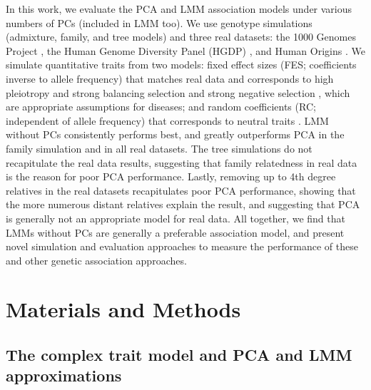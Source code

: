 \documentclass[11pt]{article}
\begin{document}
In this work, we evaluate the PCA and LMM association models under various numbers of PCs (included in LMM too).
We use genotype simulations (admixture, family, and tree models) and three real datasets: the 1000 Genomes Project \citep{the_1000_genomes_project_consortium_map_2010, 1000_genomes_project_consortium_integrated_2012}, the Human Genome Diversity Panel (HGDP) \citep{cann_human_2002, rosenberg_genetic_2002, bergstrom_insights_2020}, and Human Origins \citep{patterson_ancient_2012, lazaridis_ancient_2014, lazaridis_genomic_2016, skoglund_genomic_2016}.
We simulate quantitative traits from two models: fixed effect sizes (FES; coefficients inverse to allele frequency) that matches real data \citep{park_distribution_2011, zeng_signatures_2018, oconnor_extreme_2019} and corresponds to high pleiotropy and strong balancing selection \citep{simons_population_2018} and strong negative selection \citep{zeng_signatures_2018, oconnor_extreme_2019}, which are appropriate assumptions for diseases; and random coefficients (RC; independent of allele frequency) that corresponds to neutral traits \citep{zeng_signatures_2018, simons_population_2018}.
LMM without PCs consistently performs best, and greatly outperforms PCA in the family simulation and in all real datasets.
The tree simulations do not recapitulate the real data results, suggesting that family relatedness in real data is the reason for poor PCA performance.
Lastly, removing up to 4th degree relatives in the real datasets recapitulates poor PCA performance, showing that the more numerous distant relatives explain the result, and suggesting that PCA is generally not an appropriate model for real data.
All together, we find that LMMs without PCs are generally a preferable association model, and present novel simulation and evaluation approaches to measure the performance of these and other genetic association approaches.

\section{Materials and Methods}

\subsection{The complex trait model and PCA and LMM approximations}
\end{document}
